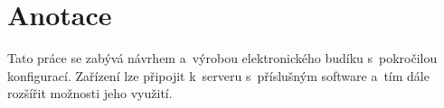 \section*{Anotace}
Tato práce se zabývá návrhem a~výrobou elektronického budíku s~pokročilou
konfigurací. Zařízení lze připojit k~serveru%
s~příslušným software a~tím dále rozšířit možnosti jeho využití.
